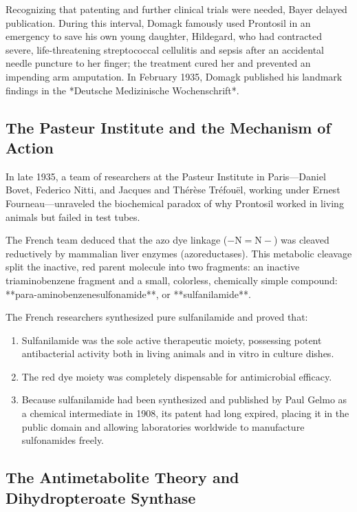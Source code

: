 Recognizing that patenting and further clinical trials were needed, Bayer delayed publication. During this interval, Domagk famously used Prontosil in an emergency to save his own young daughter, Hildegard, who had contracted severe, life-threatening streptococcal cellulitis and sepsis after an accidental needle puncture to her finger; the treatment cured her and prevented an impending arm amputation. In February 1935, Domagk published his landmark findings in the *Deutsche Medizinische Wochenschrift*.

\subsection{The Pasteur Institute and the Mechanism of Action}

In late 1935, a team of researchers at the Pasteur Institute in Paris—Daniel Bovet, Federico Nitti, and Jacques and Thérèse Tréfouël, working under Ernest Fourneau—unraveled the biochemical paradox of why Prontosil worked in living animals but failed in test tubes.

The French team deduced that the azo dye linkage ($-\text{N}=\text{N}-$) was cleaved reductively by mammalian liver enzymes (azoreductases). This metabolic cleavage split the inactive, red parent molecule into two fragments: an inactive triaminobenzene fragment and a small, colorless, chemically simple compound: **para-aminobenzenesulfonamide**, or **sulfanilamide**.

The French researchers synthesized pure sulfanilamide and proved that:
\begin{enumerate}
    \item Sulfanilamide was the sole active therapeutic moiety, possessing potent antibacterial activity both in living animals and in vitro in culture dishes.
    \item The red dye moiety was completely dispensable for antimicrobial efficacy.
    \item Because sulfanilamide had been synthesized and published by Paul Gelmo as a chemical intermediate in 1908, its patent had long expired, placing it in the public domain and allowing laboratories worldwide to manufacture sulfonamides freely.
\end{enumerate}

\subsection{The Antimetabolite Theory and Dihydropteroate Synthase}

